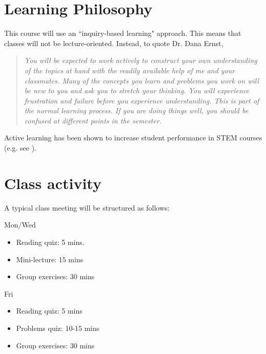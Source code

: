 \documentclass[letterpaper]{inzane_syllabus} %
\begin{document}
\vspace{0.5cm} 
\section{Learning Philosophy}

This course will use an ``inquiry-based learning" approach. This means that classes will not be lecture-oriented. Instead, to quote Dr. Dana Ernst,

\begin{quotation}
\textit{You will be expected to work actively to construct your own understanding of the topics at hand with the readily available help of me and your classmates. Many of the concepts you learn and problems you work on will be new to you and ask you to stretch your thinking. You will experience frustration and failure before you experience understanding. This is part of the normal learning process. If you are doing things well, you should be confused at different points in the semester.}
\end{quotation}

Active learning has been shown to increase student performance in STEM courses (e.g. see \cite{deslauriers2011improved, freeman2014active}). 

\vspace{0.2cm}
\section{Class activity}

A typical class meeting will be structured as follows:

\noindent
\begin{minipage}{0.45\textwidth}
Mon/Wed
\begin{itemize}
\item Reading quiz: 5 mins.
\item Mini-lecture: 15 mins
\item Group exercises: 30 mins	
\end{itemize}
\end{minipage}
\hfill
\begin{minipage}{0.45\textwidth}
Fri
\begin{itemize}
\item Reading quiz: 5 mins
\item Problems quiz: 10-15 mins 
\item Group exercises: 30 mins
\end{itemize}
\end{minipage}
\end{document}
